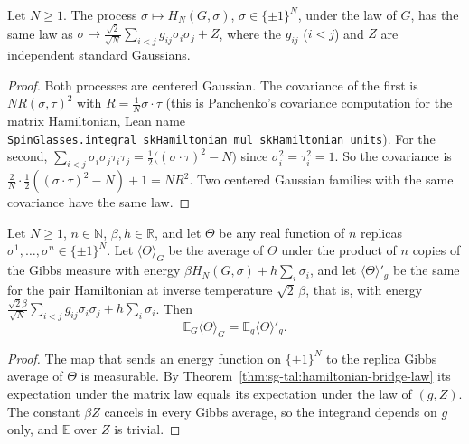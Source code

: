 \begin{theorem}\label{thm:sg-tal:hamiltonian-bridge-law}
\leanok
{}
Let $N\ge1$. The process $\sigma\mapsto H_N(G,\sigma)$, $\sigma\in\{\pm1\}^N$, under the law of $G$, has the same law as
$\sigma\mapsto\frac{\sqrt2}{\sqrt N}\sum_{i<j}g_{ij}\sigma_i\sigma_j+Z$, where the $g_{ij}$ ($i<j$) and $Z$ are independent standard Gaussians.
\end{theorem}
\begin{proof}
\leanok
Both processes are centered Gaussian. The covariance of the first is $N R(\sigma,\tau)^2$ with $R=\frac1N\sigma\cdot\tau$ (this is Panchenko's covariance computation for the matrix Hamiltonian, Lean name \texttt{SpinGlasses.integral\_skHamiltonian\_mul\_skHamiltonian\_units}).
For the second, $\sum_{i<j}\sigma_i\sigma_j\tau_i\tau_j=\frac12\bigl((\sigma\cdot\tau)^2-N\bigr)$ since $\sigma_i^2=\tau_i^2=1$. So the covariance is $\frac2N\cdot\frac12((\sigma\cdot\tau)^2-N)+1=N R^2$.
Two centered Gaussian families with the same covariance have the same law.
\end{proof}

\begin{theorem}\label{thm:sg-tal:hamiltonian-bridge-gibbs}
\leanok
{}
Let $N\ge1$, $n\in\mathbb N$, $\beta,h\in\mathbb R$, and let $\Theta$ be any real function of $n$ replicas $\sigma^1,\dots,\sigma^n\in\{\pm1\}^N$.
Let $\langle\Theta\rangle_G$ be the average of $\Theta$ under the product of $n$ copies of the Gibbs measure with energy $\beta H_N(G,\sigma)+h\sum_i\sigma_i$,
and let $\langle\Theta\rangle'_g$ be the same for the pair Hamiltonian at inverse temperature $\sqrt2\,\beta$, that is, with energy $\frac{\sqrt2\beta}{\sqrt N}\sum_{i<j}g_{ij}\sigma_i\sigma_j+h\sum_i\sigma_i$. Then
\[
\mathbb E_G\langle\Theta\rangle_G=\mathbb E_g\langle\Theta\rangle'_g .
\]
\end{theorem}
\begin{proof}
\leanok
The map that sends an energy function on $\{\pm1\}^N$ to the replica Gibbs average of $\Theta$ is measurable. By Theorem~\ref{thm:sg-tal:hamiltonian-bridge-law} its expectation under the matrix law equals its expectation
under the law of $(g,Z)$. The constant $\beta Z$ cancels in every Gibbs average, so the integrand depends on $g$ only, and $\mathbb E$ over $Z$ is trivial.
\end{proof}

